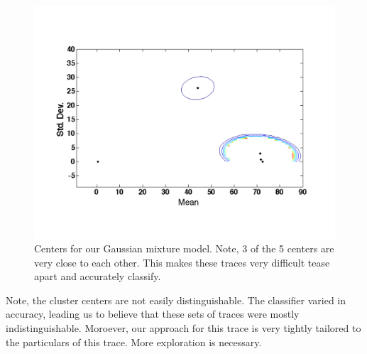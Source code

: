 \begin{figure}[t!] %
\centering
\includegraphics[width=0.8\columnwidth]{figs/gmm_centers}
\caption{Centers for our Gaussian mixture model.  Note, 3 of the 5 centers are very close to each other.  This makes these traces
very difficult tease apart and accurately classify.}
\label{fig:cluster_centers}
\end{figure}

Note, the cluster centers are not easily distinguishable.  The classifier varied in accuracy, leading us to believe that 
these sets of traces were mostly indistinguishable.  Moroever, our approach for this trace is very tightly tailored to
the particulars of this trace.  More exploration is necessary.




